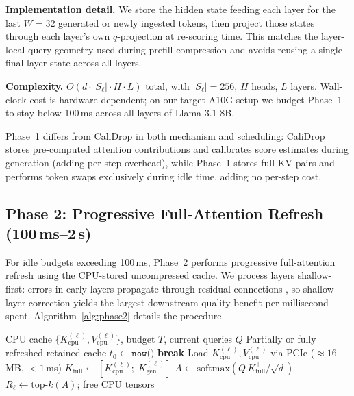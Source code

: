 \documentclass[10pt,twocolumn,letterpaper]{article}
\begin{document}
\textbf{Implementation detail.}
We store the hidden state feeding each layer for the last $W{=}32$ generated
or newly ingested tokens, then project those states through each layer's own
$q$-projection at re-scoring time. This matches the layer-local query geometry
used during prefill compression and avoids reusing a single final-layer state
across all layers.

\textbf{Complexity.}
$O(d \cdot |S_\ell| \cdot H \cdot L)$ total, with $|S_\ell|{=}256$, $H$
heads, $L$ layers.
Wall-clock cost is hardware-dependent; on our target A10G setup we budget
Phase~1 to stay below 100\,ms across all layers of Llama-3.1-8B.

Phase~1 differs from CaliDrop \citep{calidrop2025} in both mechanism and
scheduling: CaliDrop stores pre-computed attention contributions and calibrates
score estimates during generation (adding per-step overhead), while Phase~1
stores full KV pairs and performs token swaps exclusively during idle time,
adding no per-step cost.

\subsection{Phase 2: Progressive Full-Attention Refresh (100\,ms--2\,s)}
\label{sec:phase2}

For idle budgets exceeding 100\,ms, Phase~2 performs progressive full-attention
refresh using the CPU-stored uncompressed cache.
We process layers shallow-first: errors in early layers propagate through
residual connections \citep{refreshkv2025}, so shallow-layer correction
yields the largest downstream quality benefit per millisecond spent.
Algorithm~\ref{alg:phase2} details the procedure.

\begin{algorithm}[t]
\caption{Phase 2: Progressive Layer-wise Refresh}
\label{alg:phase2}
\begin{algorithmic}[1]
\REQUIRE CPU cache $\{K_{\mathrm{cpu}}^{(\ell)}, V_{\mathrm{cpu}}^{(\ell)}\}$,
         budget $T$, current queries $Q$
\ENSURE Partially or fully refreshed retained cache
\STATE $t_0 \leftarrow \texttt{now()}$
    \STATE \textbf{break}
  \ENDIF
  \STATE Load $K_{\mathrm{cpu}}^{(\ell)}, V_{\mathrm{cpu}}^{(\ell)}$
         via PCIe (${\approx}16$\,MB, ${<}1$\,ms)
  \STATE $K_{\mathrm{full}} \leftarrow
         [K_{\mathrm{cpu}}^{(\ell)};\; K_{\mathrm{gen}}^{(\ell)}]$
  \STATE $A \leftarrow \mathrm{softmax}(Q\,K_{\mathrm{full}}^\top / \sqrt{d})$
  \STATE $R_\ell \leftarrow \mathrm{top\text{-}}k(A)$;\; free CPU tensors
\ENDFOR
\end{algorithmic}
\end{algorithm}
\end{document}
